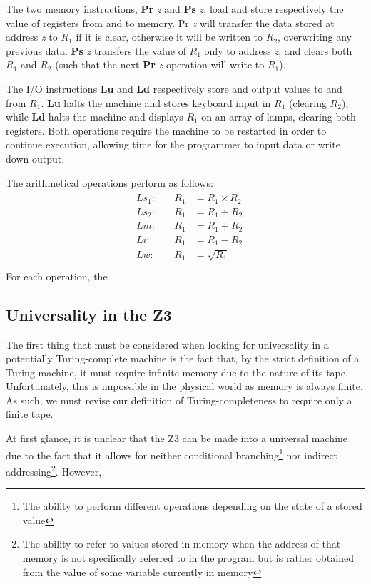 \documentclass[Master.tex]{subfiles}
\begin{document}
The two memory instructions, \textbf{Pr} \textit{z} and \textbf{Ps} \textit{z}, load and store respectively the value of registers from and to memory. Pr \textit{z} will transfer the data stored at address \textit{z} to $R_1$ if it is clear, otherwise it will be written to $R_2$, overwriting any previous data. \textbf{Ps} \textit{z} transfers the value of $R_1$ only to address \textit{z}, and clears both $R_1$ and $R_2$ (such that the next \textbf{Pr} \textit{z} operation will write to $R_1$). 

The I/O instructions \textbf{Lu} and \textbf{Ld} respectively store and output values to and from $R_1$. \textbf{Lu} halts the machine and stores keyboard input in $R_1$ (clearing $R_2$), while \textbf{Ld} halts the machine and displays $R_1$ on an array of lamps, clearing both registers. Both operations require the machine to be restarted in order to continue execution, allowing time for the programmer to input data or write down output.

The arithmetical operations perform as follows:
\begin{gather*}
\begin{aligned}
&Ls_1:\quad	&R_1 &= R_1 \times R_2 \\
&Ls_2:\quad	&R_1 &= R_1 \div R_2 \\
&Lm:\quad	&R_1 &= R_1 + R_2 \\
&Li:\quad	&R_1 &= R_1 - R_2 \\
&Lw:\quad	&R_1 &= \sqrt{R_1} \\
\end{aligned}
\end{gather*}
For each operation, the 
\subsection{Universality in the Z3}

The first thing that must be considered when looking for universality in a potentially Turing-complete machine is the fact that, by the strict definition of a Turing machine, it must require infinite memory due to the nature of its tape. Unfortunately, this is impossible in the physical world as memory is always finite. As such, we must revise our definition of Turing-completeness to require only a finite tape.

At first glance, it is unclear that the Z3 can be made into a universal machine due to the fact that it allows for neither conditional branching\footnote{The ability to perform different operations depending on the state of a stored value} nor indirect addressing\footnote{The ability to refer to values stored in memory when the address of that memory is not specifically referred to in the program but is rather obtained from the value of some variable currently in memory}. However, 
\end{document}
